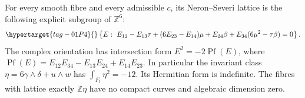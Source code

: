 \begin{proposition}\hypertarget{tag-01QU}{}\label{fam:src:D.1.4}\label{fam:st:D.1.4}

For every smooth fibre and every admissible \(c\), its Neron--Severi lattice
is the following explicit subgroup of \(\mathbb Z^6\):
\begin{equation}\hypertarget{tag-01P4}{}\label{fam:eq:cd-NS}
 \left\{E:\ E_{12}-E_{13}\tau+(6E_{23}-E_{14})\mu+
 E_{24}\beta+E_{34}(6\mu^2-\tau\beta)=0\right\}.
\end{equation}
The complex orientation has intersection form
\(E^2=-2\operatorname{Pf}(E)\), where
\(\operatorname{Pf}(E)=E_{12}E_{34}-E_{13}E_{24}+E_{14}E_{23}\).
In particular the invariant class \(\eta=6\gamma\wedge\delta+u\wedge w\)
has \(\int_{F_t}\eta^2=-12\). Its Hermitian form is indefinite.
The fibres with lattice exactly \(\mathbb Z\eta\) have no compact curves
and algebraic dimension zero.
\end{proposition}


